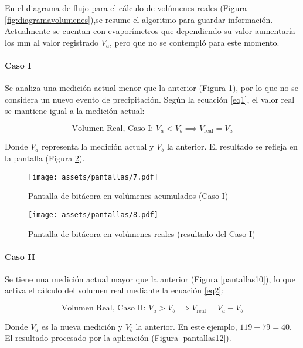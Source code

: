 En el diagrama de flujo para el cálculo de volúmenes reales (Figura \ref{fig:diagramavolumenes}),se resume el algoritmo para guardar información. Actualmente se cuentan con evaporímetros que dependiendo su valor aumentaría los mm al valor registrado $V_a$, pero que no se contempló para este momento.

\paragraph{Caso I}

Se analiza una medición actual menor que la anterior (Figura \ref{pantallas7}), por lo que no se considera un nuevo evento de precipitación. Según la ecuación \ref{eq1}, el valor real se mantiene igual a la medición actual:

\begin{equation}
\text{Volumen Real, Caso I: } V_{a} < V_{b} \implies V_{\text{real}} = V_{a}
\label{eq1}
\end{equation}

Donde $V_{a}$ representa la medición actual y $V_{b}$ la anterior. El resultado se refleja en la pantalla (Figura \ref{pantallas8}).

\begin{figure}[h!]
\centering
\texttt{[image: assets/pantallas/7.pdf]}
\caption{Pantalla de bitácora en volúmenes acumulados (Caso I)}
\label{pantallas7}
\end{figure}

\begin{figure}[h!]
\centering
\texttt{[image: assets/pantallas/8.pdf]}
\caption{Pantalla de bitácora en volúmenes reales (resultado del Caso I)}
\label{pantallas8}
\end{figure}

\paragraph{Caso II}

Se tiene una medición actual mayor que la anterior (Figura \ref{pantallas10}), lo que activa el cálculo del volumen real mediante la ecuación \ref{eq2}:

\begin{equation}
\text{Volumen Real, Caso II: } V_{a} > V_{b} \implies V_{\text{real}} = V_{a} - V_{b}
\label{eq2}
\end{equation}

Donde $V_{a}$ es la nueva medición y $V_{b}$ la anterior. En este ejemplo, $119 - 79 = 40$. El resultado procesado por la aplicación (Figura \ref{pantallas12}).

